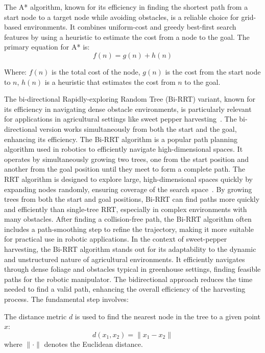 \documentclass[a4paper,fleqn]{cas-dc}
\begin{document}
The A* algorithm, known for its efficiency in finding the shortest path from a start node to a target node while avoiding obstacles, is a reliable choice for grid-based environments. It combines uniform-cost and greedy best-first search features by using a heuristic to estimate the cost from a node to the goal. The primary equation for A* is:
\begin{equation}
f(n) = g(n) + h(n)
\label{eq:astar}
\end{equation}

Where:
$f(n)$ is the total cost of the node, 
$g(n)$ is the cost from the start node to $n$, 
$h(n)$ is a heuristic that estimates the cost from $n$ to the goal.

The bi-directional Rapidly-exploring Random Tree (Bi-RRT) variant, known for its efficiency in navigating dense obstacle environments, is particularly relevant for applications in agricultural settings like sweet pepper harvesting~\cite {bac2016analysis}. The bi-directional version works simultaneously from both the start and the goal, enhancing its efficiency. 
The Bi-RRT algorithm is a popular path planning algorithm used in robotics to efficiently navigate high-dimensional spaces. It operates by simultaneously growing two trees, one from the start position and another from the goal position until they meet to form a complete path.
The RRT algorithm is designed to explore large, high-dimensional spaces quickly by expanding nodes randomly, ensuring coverage of the search space~\cite{lavalle1998rapidly}.
By growing trees from both the start and goal positions, Bi-RRT can find paths more quickly and efficiently than single-tree RRT, especially in complex environments with many obstacles.
After finding a collision-free path, the Bi-RRT algorithm often includes a path-smoothing step to refine the trajectory, making it more suitable for practical use in robotic applications.
In the context of sweet-pepper harvesting, the Bi-RRT algorithm stands out for its adaptability to the dynamic and unstructured nature of agricultural environments. It efficiently navigates through dense foliage and obstacles typical in greenhouse settings, finding feasible paths for the robotic manipulator. The bidirectional approach reduces the time needed to find a valid path, enhancing the overall efficiency of the harvesting process.
The fundamental step involves:

The distance metric \( d \) is used to find the nearest node in the tree to a given point \( x \):
\begin{equation}
d(x_1, x_2) = \| x_1 - x_2 \|
\end{equation}
where \( \| \cdot \| \) denotes the Euclidean distance.
\end{document}
